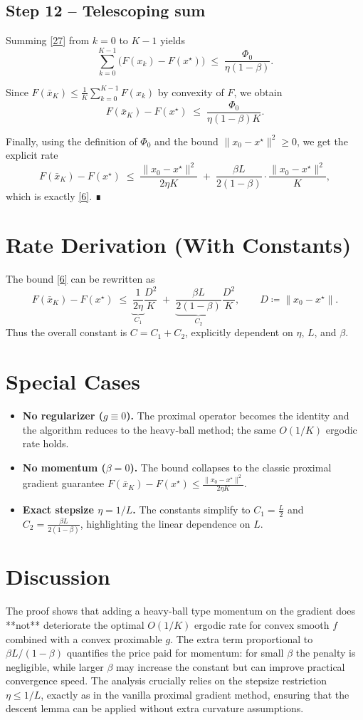 \documentclass{article}
\begin{document}
\subsection*{Step 12 – Telescoping sum}
Summing \eqref{27} from $k=0$ to $K-1$ yields
\[
\sum_{k=0}^{K-1}\bigl(F(x_k)-F(x^\star)\bigr)
\;\le\; \frac{\Phi_0}{\eta(1-\beta)} .
\tag{28}
\]

Since $F(\bar{x}_K)\le \frac{1}{K}\sum_{k=0}^{K-1}F(x_k)$ by convexity of $F$, we obtain
\[
F(\bar{x}_K)-F(x^\star)\;\le\;
\frac{\Phi_0}{\eta(1-\beta)K}.
\tag{29}
\]

Finally, using the definition of $\Phi_0$ and the bound $\|x_0-x^\star\|^2\ge0$, we get the explicit rate
\[
F(\bar{x}_K)-F(x^\star)\;\le\;
\frac{\|x_0-x^\star\|^2}{2\eta K}
\;+\;
\frac{\beta L}{2(1-\beta)}\cdot\frac{\|x_0-x^\star\|^2}{K},
\]
which is exactly \eqref{6}.  ∎

\section*{Rate Derivation (With Constants)}
The bound \eqref{6} can be rewritten as
\[
F(\bar{x}_K)-F(x^\star)\;\le\;
\underbrace{\frac{1}{2\eta}}_{\displaystyle C_1}\frac{D^2}{K}
\;+\;
\underbrace{\frac{\beta L}{2(1-\beta)}}_{\displaystyle C_2}\frac{D^2}{K},
\qquad D\coloneqq\|x_0-x^\star\|.
\]
Thus the overall constant is $C=C_1+C_2$, explicitly dependent on $\eta$, $L$, and $\beta$.

\section*{Special Cases}
\begin{itemize}
  \item \textbf{No regularizer ($g\equiv0$).} The proximal operator becomes the identity and the algorithm reduces to the heavy‑ball method; the same $O(1/K)$ ergodic rate holds.
  \item \textbf{No momentum ($\beta=0$).} The bound collapses to the classic proximal gradient guarantee $F(\bar{x}_K)-F(x^\star)\le \frac{\|x_0-x^\star\|^2}{2\eta K}$.
  \item \textbf{Exact stepsize $\eta=1/L$.} The constants simplify to $C_1=\frac{L}{2}$ and $C_2=\frac{\beta L}{2(1-\beta)}$, highlighting the linear dependence on $L$.
\end{itemize}

\section*{Discussion}
The proof shows that adding a heavy‑ball type momentum on the gradient does **not** deteriorate the optimal $O(1/K)$ ergodic rate for convex smooth $f$ combined with a convex proximable $g$.  The extra term proportional to $\beta L/(1-\beta)$ quantifies the price paid for momentum: for small $\beta$ the penalty is negligible, while larger $\beta$ may increase the constant but can improve practical convergence speed.  The analysis crucially relies on the stepsize restriction $\eta\le 1/L$, exactly as in the vanilla proximal gradient method, ensuring that the descent lemma can be applied without extra curvature assumptions.
\end{document}

